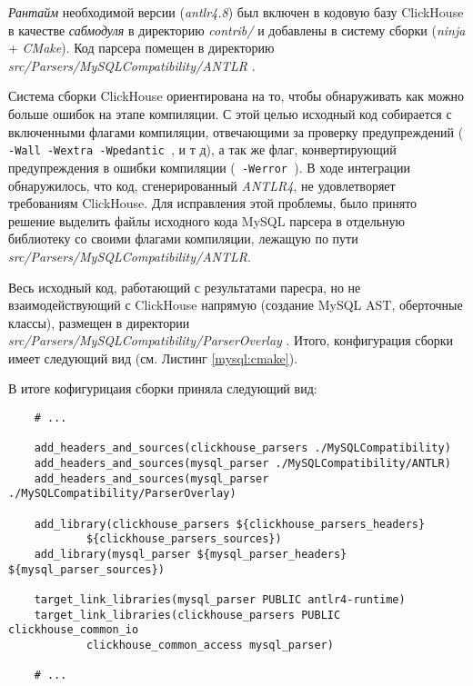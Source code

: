 \textit{Рантайм} необходимой версии (\textit{antlr4.8}) был включен в кодовую базу ClickHouse в качестве \textit{сабмодуля} в директорию \textit{contrib/} и добавлены в систему сборки (\textit{ninja} + \textit{CMake}). Код парсера помещен в директорию\\ \textit{src/Parsers/MySQLCompatibility/ANTLR} \cite{merge_request}.

Система сборки ClickHouse ориентирована на то, чтобы обнаруживать как можно больше ошибок на этапе компиляции. С этой целью исходный код собирается с включенными флагами компиляции, отвечающими за проверку предупреждений (\texttt{ -Wall -Wextra -Wpedantic }, и т д), а так же флаг, конвертирующий предупреждения в ошибки компиляции (\texttt{ -Werror }). В ходе интеграции обнаружилось, что код, сгенерированный \textit{ANTLR4}, не удовлетворяет требованиям ClickHouse. Для исправления этой проблемы, было принято решение выделить файлы исходного кода MySQL парсера в отдельную библиотеку со своими флагами компиляции, лежащую по пути \textit{src/Parsers/MySQLCompatibility/ANTLR}\cite{merge_request}. 

Весь исходный код, работающий с результатами паресра, но не взаимодействующий с ClickHouse напрямую (создание MySQL AST, оберточные классы), размещен в директории \textit{src/Parsers/MySQLCompatibility/ParserOverlay} \cite{merge_request}. Итого, конфигурация сборки имеет следующий вид (см. Листинг \ref{mysql:cmake}).

В итоге кофигурицаия сборки приняла следующий вид:
\begin{code}
    \label{mysql:cmake}
    \begin{verbatim}
    # ...

    add_headers_and_sources(clickhouse_parsers ./MySQLCompatibility)
    add_headers_and_sources(mysql_parser ./MySQLCompatibility/ANTLR)
    add_headers_and_sources(mysql_parser ./MySQLCompatibility/ParserOverlay)

    add_library(clickhouse_parsers ${clickhouse_parsers_headers}
            ${clickhouse_parsers_sources})
    add_library(mysql_parser ${mysql_parser_headers} ${mysql_parser_sources})

    target_link_libraries(mysql_parser PUBLIC antlr4-runtime)
    target_link_libraries(clickhouse_parsers PUBLIC clickhouse_common_io
            clickhouse_common_access mysql_parser)

    # ...
    \end{verbatim}
\end{code}

